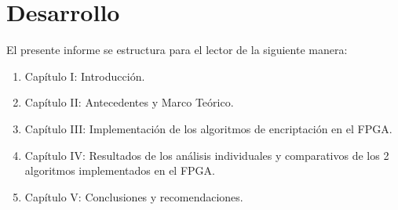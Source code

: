 \section{Desarrollo}

El presente informe se estructura para el lector de la siguiente manera:

\begin{enumerate}
\item Capítulo I: Introducción.

\item Capítulo II: Antecedentes y Marco Teórico. 

\item Capítulo III: Implementación de los algoritmos de encriptación en el FPGA.

\item Capítulo IV: Resultados de los análisis individuales y comparativos de los 2 algoritmos implementados en el FPGA.

\item Capítulo V: Conclusiones y recomendaciones.

\end{enumerate}